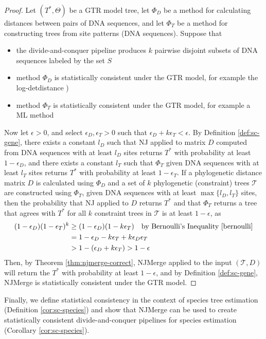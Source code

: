 \begin{proof}
Let $(T^*, \Theta)$ be a GTR model tree, let $\Phi_D$ be a method for calculating distances between pairs of DNA sequences, and let $\Phi_T$ be a method for constructing trees from site patterns (DNA sequences).
Suppose that 
\begin{itemize}
	\item the divide-and-conquer pipeline produces $k$ pairwise disjoint subsets of DNA sequences labeled by the set $S$
	\item method $\Phi_D$ is statistically consistent under the GTR model, for example  the \gls{log-detdistance} \cite{steel1994recovering})
	\item method $\Phi_T$ is statistically consistent under the GTR model, for example a \gls{ML} method \cite{truszkowski2016maximum}
\end{itemize}
Now let $\epsilon > 0$, and select $\epsilon_D, \epsilon_T > 0$ such that $\epsilon_D + k \epsilon_T < \epsilon$.
By Definition \ref{def:sc-gene}, there exists a constant $l_D$ such that NJ applied to matrix $D$ computed from DNA sequences with at least $l_D$ sites returns $T^*$ with probability at least $1 - \epsilon_D$, and there exists a constant $l_T$ such that $\Phi_T$ given DNA sequences with at least $l_T$ sites returns $T^*$ with probability at least $1 - \epsilon_T$.
If a phylogenetic distance matrix $D$ is calculated using $\Phi_D$ and a set of $k$ phylogenetic (constraint) trees $\mathcal{T}$ are constructed using $\Phi_T$, given DNA sequences with at least $\max\{l_D, l_T\}$ sites, then the probability that NJ applied to $D$ returns $T^*$ and that $\Phi_T$ returns a tree that agrees with $T^*$ for all $k$ constraint trees in $\mathcal{T}$ is at least $1 - \epsilon$, as
\begin{align}
	(1 - \epsilon_D) (1 - \epsilon_T)^k &\ge (1 - \epsilon_D) (1 - k \epsilon_T) \quad \text{by Bernoulli's Inequality \cite{bernoulli}}  \\
	&= 1 - \epsilon_D - k \epsilon_T + k \epsilon_D \epsilon_T \nonumber \\
	&> 1 - (\epsilon_D + k \epsilon_T) > 1 - \epsilon \nonumber
\end{align}
Then, by Theorem \ref{thm:njmerge-correct}, NJMerge applied to the input $(\mathcal{T}, D)$ will return the $T^*$ with probability at least $1 - \epsilon$, and by Definition \ref{def:sc-gene}, NJMerge is statistically consistent under the GTR model.
\end{proof}

Finally, we define statistical consistency in the context of species tree estimation (Definition \ref{cor:sc-species}) and show that NJMerge can be used to create statistically consistent divide-and-conquer pipelines for species estimation (Corollary \ref{cor:sc-species}).

